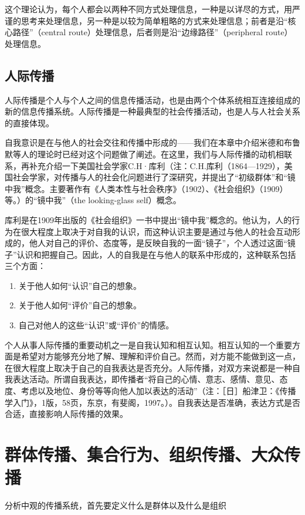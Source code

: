 \documentclass[UTF8,12pt]{ctexart}
\numberwithin{equation}{section} %
\numberwithin{figure}{section}
\numberwithin{table}{section}
\begin{document}
	这个理论认为，每个人都会以两种不同方式处理信息，一种是以详尽的方式，用严谨的思考来处理信息，另一种是以较为简单粗略的方式来处理信息；前者是沿“核心路径”（central route）处理信息，后者则是沿“边缘路径”（peripheral route）处理信息。
	
	\subsection{人际传播}
	人际传播是个人与个人之间的信息传播活动，也是由两个个体系统相互连接组成的新的信息传播系统。人际传播是一种最典型的社会传播活动，也是人与人社会关系的直接体现。
	
	自我意识是在与他人的社会交往和传播中形成的——我们在本章中介绍米德和布鲁默等人的理论时已经对这个问题做了阐述。在这里，我们与人际传播的动机相联系，再补充介绍一下美国社会学家C.H·库利（注：C.H.库利（1864—1929），美国社会学家，对传播与人的社会化问题进行了深研究，并提出了“初级群体”和“镜中我”概念。主要著作有《人类本性与社会秩序》（1902）、《社会组织》（1909）等。）的“镜中我”（the looking-glass self）概念。
	
	库利是在1909年出版的《社会组织》一书中提出“镜中我”概念的。他认为，人的行为在很大程度上取决于对自我的认识，而这种认识主要是通过与他人的社会互动形成的，他人对自己的评价、态度等，是反映自我的一面“镜子”，个人透过这面“镜子”认识和把握自己。因此，人的自我是在与他人的联系中形成的，这种联系包括三个方面：
	\begin{enumerate}
		\item 关于他人如何“认识”自己的想象。
		
		\item 关于他人如何“评价”自己的想象。
		
		\item 自己对他人的这些“认识”或“评价”的情感。
	\end{enumerate}
	
	个人从事人际传播的重要动机之一是自我认知和相互认知。相互认知的一个重要方面是希望对方能够充分地了解、理解和评价自己。然而，对方能不能做到这一点，在很大程度上取决于自己的自我表达是否充分。人际传播，对双方来说都是一种自我表达活动。所谓自我表达，即传播者“将自己的心情、意志、感情、意见、态度、考虑以及地位、身份等等向他人加以表达的活动”（注：［日］船津卫：《传播学入门》，1版，58页，东京，有斐阁，1997。）。自我表达是否准确，表达方式是否合适，直接影响人际传播的效果。
	
	\section{群体传播、集合行为、组织传播、大众传播}
	分析中观的传播系统，首先要定义什么是群体以及什么是组织
	
\end{document}
